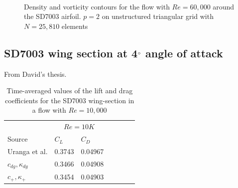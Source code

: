 \begin{figure}[htbp]
\centering
{}
\\

\caption{Density and vorticity contours for the flow with $Re = 60,000$ around the SD7003 airfoil. $p=2$ on unstructured triangular grid with $N = 25,810$ elements}
\label{sdairfoilre60k}
\end{figure}




\subsection{SD7003 wing section at 4$^{\circ}$ angle of attack}
From David's thesis.

\begin{table}[H]
\centering
\begin{tabular}{ l| l l| l l| l l} 
  
 &  \multicolumn{2}{|c|}{$Re = 10K$}  \\ 
 Source & $C_L$ & $C_D$    \\ 
\hline
 Uranga et al.\cite{uranga2011implicit} & 0.3743 & 0.04967   \\ 
$c_{dg},\kappa_{dg}$ & 0.3466 & 0.04908  \\ 
$c_{+},\kappa_{+}$ & 0.3454 & 0.04903 \\ 
 \end{tabular}
\caption{Time-averaged values of the lift and drag coefficients for the SD7003 wing-section in a flow with $Re = 10,000$}
\label{table:sdWingForce} 
 \end{table}


